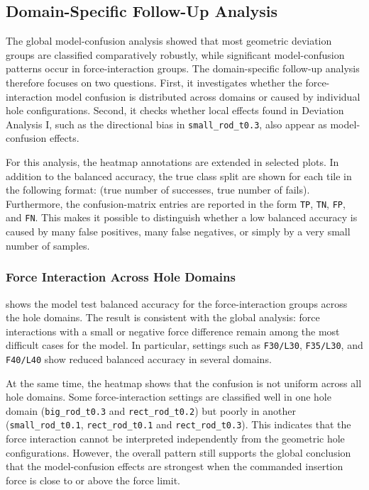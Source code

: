 \newpage
\subsection{Domain-Specific Follow-Up Analysis}
\label{subsec:da2_domain_specific}

The global model-confusion analysis showed that most geometric deviation groups are classified comparatively robustly, while significant model-confusion patterns occur in force-interaction groups. The domain-specific follow-up analysis therefore focuses on two questions. First, it investigates whether the force-interaction model confusion is distributed across domains or caused by individual hole configurations. Second, it checks whether local effects found in Deviation Analysis I, such as the directional bias in \texttt{small\_rod\_t0.3}, also appear as model-confusion effects.

For this analysis, the heatmap annotations are extended in selected plots. In addition to the balanced accuracy, the true class split are shown for each tile in the following format: (true number of successes, true number of fails). Furthermore, the confusion-matrix entries are reported in the form \texttt{TP}, \texttt{TN}, \texttt{FP}, and \texttt{FN}. This makes it possible to distinguish whether a low balanced accuracy is caused by many false positives, many false negatives, or simply by a very small number of samples.

\subsubsection{Force Interaction Across Hole Domains}
\label{subsubsec:da2_force_interaction_domains}

 shows the model test balanced accuracy for the force-interaction groups across the hole domains. The result is consistent with the global analysis: force interactions with a small or negative force difference remain among the most difficult cases for the model. In particular, settings such as \texttt{F30/L30}, \texttt{F35/L30}, and \texttt{F40/L40} show reduced balanced accuracy in several domains.

At the same time, the heatmap shows that the confusion is not uniform across all hole domains. Some force-interaction settings are classified well in one hole domain (\texttt{big\_rod\_t0.3} and \texttt{rect\_rod\_t0.2}) but poorly in another (\texttt{small\_rod\_t0.1}, \texttt{rect\_rod\_t0.1} and \texttt{rect\_rod\_t0.3}). This indicates that the force interaction cannot be interpreted independently from the geometric hole configurations. However, the overall pattern still supports the global conclusion that the model-confusion effects are strongest when the commanded insertion force is close to or above the force limit.

